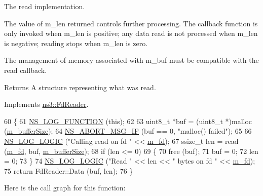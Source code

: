 The read implementation. 

The value of {\ttfamily m\+\_\+len} returned controls further processing. The callback function is only invoked when {\ttfamily m\+\_\+len} is positive; any data read is not processed when {\ttfamily m\+\_\+len} is negative; reading stops when {\ttfamily m\+\_\+len} is zero.

The management of memory associated with {\ttfamily m\+\_\+buf} must be compatible with the read callback.

\begin{DoxyReturn}{Returns}
A structure representing what was read. 
\end{DoxyReturn}


Implements \hyperlink{classns3_1_1FdReader_a5d622d726859828ba7bc557b57689b1b}{ns3\+::\+Fd\+Reader}.


\begin{DoxyCode}
60 \{
61   \hyperlink{log-macros-disabled_8h_a90b90d5bad1f39cb1b64923ea94c0761}{NS\_LOG\_FUNCTION} (\textcolor{keyword}{this});
62 
63   uint8\_t *buf = (uint8\_t *)malloc (\hyperlink{classns3_1_1FdNetDeviceFdReader_a12388cd870f27e4b6b99525faf45a25e}{m\_bufferSize});
64   \hyperlink{group__fatal_ga6653324225bc139e46deea177614ceee}{NS\_ABORT\_MSG\_IF} (buf == 0, \textcolor{stringliteral}{"malloc() failed"});
65 
66   \hyperlink{group__logging_ga88acd260151caf2db9c0fc84997f45ce}{NS\_LOG\_LOGIC} (\textcolor{stringliteral}{"Calling read on fd "} << \hyperlink{classns3_1_1FdReader_ad0883be1c0ebac30885c17c0cc17076d}{m\_fd});
67   ssize\_t len = read (\hyperlink{classns3_1_1FdReader_ad0883be1c0ebac30885c17c0cc17076d}{m\_fd}, buf, \hyperlink{classns3_1_1FdNetDeviceFdReader_a12388cd870f27e4b6b99525faf45a25e}{m\_bufferSize});
68   \textcolor{keywordflow}{if} (len <= 0)
69     \{
70       free (buf);
71       buf = 0;
72       len = 0;
73     \}
74   \hyperlink{group__logging_ga88acd260151caf2db9c0fc84997f45ce}{NS\_LOG\_LOGIC} (\textcolor{stringliteral}{"Read "} << len << \textcolor{stringliteral}{" bytes on fd "} << \hyperlink{classns3_1_1FdReader_ad0883be1c0ebac30885c17c0cc17076d}{m\_fd});
75   \textcolor{keywordflow}{return} FdReader::Data (buf, len);
76 \}
\end{DoxyCode}


Here is the call graph for this function\+:


